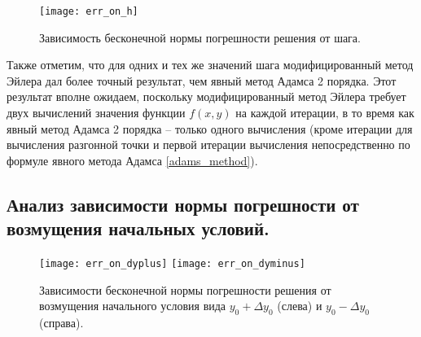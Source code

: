 \documentclass[a4paper, 12pt]{article}
\begin{document}
	\begin{figure}[H]\centering
		\texttt{[image: err\_on\_h]}
		\caption{Зависимость бесконечной нормы погрешности решения от шага.}\label{fig:err_on_h}
	\end{figure}
	
	Также отметим, что для одних и тех же значений шага модифицированный метод Эйлера дал более точный результат, чем явный метод Адамса 2 порядка. Этот результат вполне ожидаем, поскольку модифицированный метод Эйлера требует двух вычислений значения функции $f(x,y)$ на каждой итерации, в то время как явный метод Адамса 2 порядка -- только одного вычисления (кроме итерации для вычисления разгонной точки и первой итерации вычисления непосредственно по формуле явного метода Адамса \eqref{adams_method}).
	
	\subsection{Анализ зависимости нормы погрешности от возмущения начальных условий.}

	\begin{figure}[H]\centering
		\texttt{[image: err\_on\_dyplus]}
		\texttt{[image: err\_on\_dyminus]}
		\caption{Зависимости бесконечной нормы погрешности решения от возмущения начального условия вида $y_0+\Delta y_0$ (слева) и $y_0-\Delta y_0$ (справа).}\label{fig:err_on_dy}
	\end{figure}
	
\end{document}
